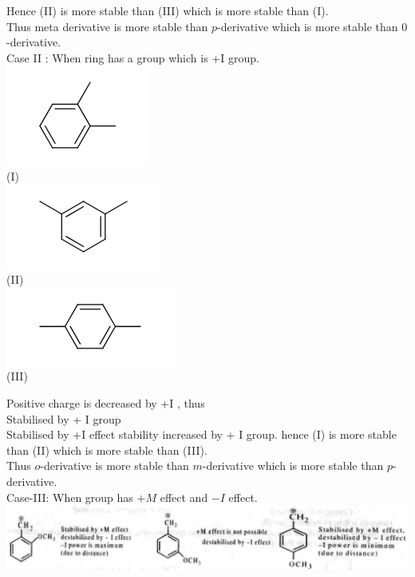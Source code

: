 \documentclass[10pt]{article}
\begin{document}
Hence (II) is more stable than (III) which is more stable than (I).\\
Thus meta derivative is more stable than $p$-derivative which is more stable than 0 -derivative.\\
Case II : When ring has a group which is +I group.\\
\includegraphics{smile-b403436adf6ef8be76013fe8b11796e55b3ee2d6}\\
(I)\\
\includegraphics{smile-70c47dbab84c7f23e6f03fef1031003389e4e835}\\
(II)\\
\includegraphics{smile-55ffe2790ea44392ff14044c76aa945c66dc2a27}\\
(III)

Positive charge is decreased by +I , thus\\
Stabilised by + I group\\
Stabilised by +I effect stability increased by + I group. hence (I) is more stable than (II) which is more stable than (III).\\
Thus $o$-derivative is more stable than $m$-derivative which is more stable than $p$-derivative.\\
Case-III: When group has $+M$ effect and $-I$ effect.\\
\includegraphics[max width=\textwidth, center]{2025_01_28_8470952b98110cec3aabg-076(1)}
\end{document}
